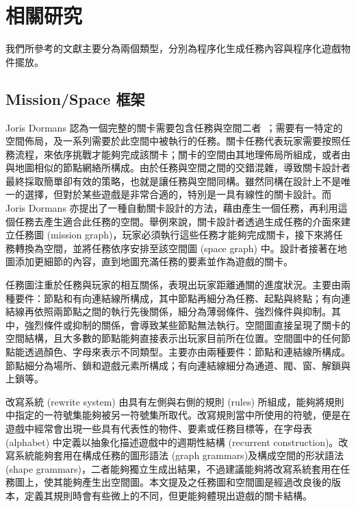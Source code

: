 \chapter{相關研究}
\label{cha:related_works}

我們所參考的文獻主要分為兩個類型，分別為程序化生成任務內容與程序化遊戲物件擺放。

\section{Mission/Space 框架}

Joris Dormans 認為一個完整的關卡需要包含任務與空間二者~\cite{dormans2011level}；需要有一特定的空間佈局，及一系列需要於此空間中被執行的任務。關卡任務代表玩家需要按照任務流程，來依序挑戰才能夠完成該關卡；關卡的空間由其地理佈局所組成，或者由與地圖相似的節點網絡所構成。由於任務與空間之間的交錯混雜，導致關卡設計者最終採取簡單卻有效的策略，也就是讓任務與空間同構。雖然同構在設計上不是唯一的選擇，但對於某些遊戲是非常合適的，特別是一具有線性的關卡設計。而 Joris Dormans 亦提出了一種自動關卡設計的方法，藉由產生一個任務，再利用這個任務去產生適合此任務的空間。舉例來說，關卡設計者透過生成任務的介面來建立任務圖 (mission graph)，玩家必須執行這些任務才能夠完成關卡，接下來將任務轉換為空間，並將任務依序安排至該空間圖 (space graph) 中。設計者接著在地圖添加更細節的內容，直到地圖充滿任務的要素並作為遊戲的關卡。

任務圖注重於任務與玩家的相互關係，表現出玩家距離通關的進度狀況。主要由兩種要件：節點和有向連結線所構成，其中節點再細分為任務、起點與終點；有向連結線再依照兩節點之間的執行先後關係，細分為薄弱條件、強烈條件與抑制。其中，強烈條件或抑制的關係，會導致某些節點無法執行。空間圖直接呈現了關卡的空間結構，且大多數的節點能夠直接表示出玩家目前所在位置。空間圖中的任何節點能透過顏色、字母來表示不同類型。主要亦由兩種要件：節點和連結線所構成。節點細分為場所、鎖和遊戲元素所構成；有向連結線細分為通道、閥、窗、解鎖與上鎖等。

改寫系統 (rewrite system) 由具有左側與右側的規則 (rules) 所組成，能夠將規則中指定的一符號集能夠被另一符號集所取代。改寫規則當中所使用的符號，便是在遊戲中經常會出現一些具有代表性的物件、要素或任務目標等，在字母表 (alphabet) 中定義以抽象化描述遊戲中的週期性結構 (recurrent construction)。改寫系統能夠套用在構成任務的圖形語法 (graph grammars)及構成空間的形狀語法 (shape grammars)，二者能夠獨立生成出結果，不過建議能夠將改寫系統套用在任務圖上，使其能夠產生出空間圖。本文提及之任務圖和空間圖是經過改良後的版本，定義其規則時會有些微上的不同，但更能夠體現出遊戲的關卡結構。


